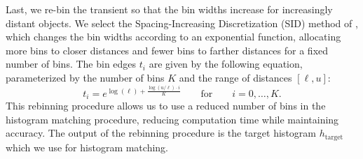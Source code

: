 \vspace{0.8em}
Last, we re-bin the transient so that the bin widths increase for increasingly
distant objects. We select the Spacing-Increasing Discretization
(SID) method of \cite{Fu2018}, which changes the bin widths according to an  
exponential function, allocating more bins to closer distances and fewer
bins to farther distances for a fixed number of bins. The bin edges $t_i$ are
given by the following equation,
parameterized by the number of bins $K$ and the range of distances $[\ell, u]$: 
\begin{equation}
  t_i = e^{\log(\ell) + \frac{\log(u/\ell) \cdot i}{K}}  \qquad\text{for}\qquad i = 0,\ldots, K.
  \label{eq:sid_bin_edges}
\end{equation}
This rebinning procedure allows us to use a reduced number of bins in the histogram
matching procedure, reducing computation time while maintaining accuracy.
 The output of the rebinning procedure is the
target histogram $h_\text{target}$ which we use for histogram matching. 



